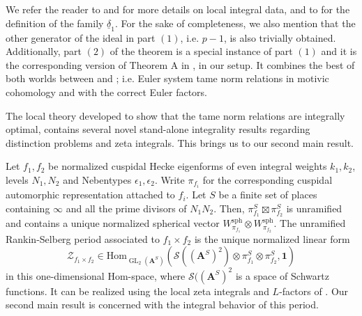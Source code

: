 \documentclass{amsart}%
\theoremstyle{plain}
\theoremstyle{plain}
\theoremstyle{remark}
\DeclareMathOperator{\GL}{GL}
\begin{document}
  \noindent 
  We refer the reader to  and  for more details on local integral data, and to  for the definition of the family $\underline{\delta}_1$. For the sake of completeness, we also mention that the other generator of the ideal in part $(1)$, i.e. $p-1$, is also trivially obtained. Additionally, part $(2)$ of the theorem is a special instance of part $(1)$ and it is the corresponding version of Theorem A in \cite{Loeffler_2021}, in our setup. It combines the best of both worlds between \cite{Lei_2014} and \cite{grossi2020norm}; i.e. Euler system tame norm relations in motivic cohomology and with the correct Euler factors. 
     
 
 
 The local theory developed to show that the tame norm relations are integrally optimal, contains several novel stand-alone integrality results regarding distinction problems and zeta integrals. This brings us to our second main result.
 
 Let $f_1,f_2$ be normalized cuspidal Hecke eigenforms of even integral weights $k_1,k_2$, levels $N_1,N_2$ and Nebentypes $\epsilon_1,\epsilon_2$. Write $\pi_{f_i}$ for the corresponding cuspidal automorphic representation attached to $f_i$. Let $S$ be a finite set of places containing $\infty$ and all the prime divisors of $N_1N_2$. Then, $\pi_{f_1}^S\boxtimes\pi_{f_2}^S$ is unramified and contains a unique normalized spherical vector $W_{\pi_{f_1}}^\mathrm{sph}\otimes W_{\pi_{f_2}}^\mathrm{sph}$. The unramified Rankin-Selberg period associated to $f_1\times f_2$ is the unique normalized linear form
 $$\mathcal{Z}_{f_1\times f_2}\in\mathrm{Hom}_{\GL_2(\mathbf{A}^S)}\left(\mathcal{S}((\mathbf{A}^S)^2)\otimes \pi_{f_1}^S\otimes\pi_{f_2}^S,\mathbf{1}\right)$$
 in this one-dimensional Hom-space, where $\mathcal{S}((\mathbf{A}^S)^2$ is a space of Schwartz functions. It can be realized using the local zeta integrals and $L$-factors of \cite{jacquet1981euler}. Our second main result is concerned with the integral behavior of this period.
\end{document}
